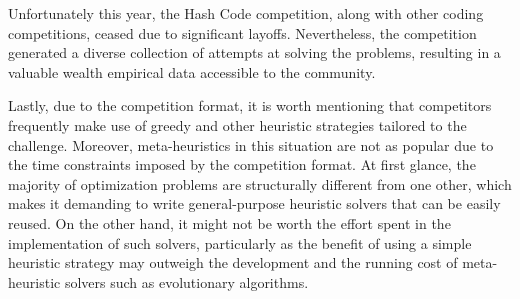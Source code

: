 Unfortunately this year, the Hash Code competition, along with other coding
competitions, ceased due to significant layoffs. Nevertheless, the competition
generated a diverse collection of attempts at solving the problems, resulting in
a valuable wealth empirical data accessible to the community.

Lastly, due to the competition format, it is worth mentioning that competitors
frequently make use of greedy and other heuristic strategies tailored to the
challenge. Moreover, meta-heuristics in this situation are not as popular due to
the time constraints imposed by the competition format. At first glance, the
majority of optimization problems are structurally different from one other,
which makes it demanding to write general-purpose heuristic solvers that can be
easily reused.  On the other hand, it might not be worth the effort spent in the
implementation of such solvers, particularly as the benefit of using a simple
heuristic strategy may outweigh the development and the running cost of
meta-heuristic solvers such as evolutionary algorithms.